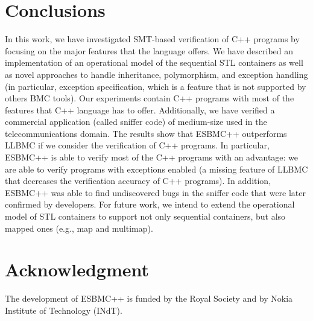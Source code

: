 \documentclass[conference]{IEEEtran}
\begin{document}

\section{Conclusions}
\label{conclusions}

In this work, we have investigated SMT-based verification of C++ programs
by focusing on the major features that the language offers. We have described
an implementation of an operational model of the sequential STL containers
as well as novel approaches to handle inheritance, polymorphism, and exception handling
(in particular, exception specification, which is a feature that is not supported by others
BMC tools). Our experiments contain C++ programs with most of the features that C++ language 
has to offer. Additionally, we have verified a commercial application (called sniffer code) of medium-size 
used in the telecommunications domain. The results show that ESBMC++ outperforms LLBMC if we 
consider the verification of C++ programs. In particular, ESBMC++ is able to verify most of the 
C++ programs with an advantage: we are able to verify programs
with exceptions enabled (a missing feature of LLBMC that decreases the verification accuracy of
C++ programs). In addition, ESBMC++ was able to find undiscovered bugs in the sniffer code that
were later confirmed by developers. For future work, we intend to extend the operational model of STL containers
to support not only sequential containers, but also mapped ones (e.g., map and multimap).




\section*{Acknowledgment}
The development of ESBMC++ is funded by the Royal Society and by Nokia Institute of Technology (INdT). 

\end{document}
